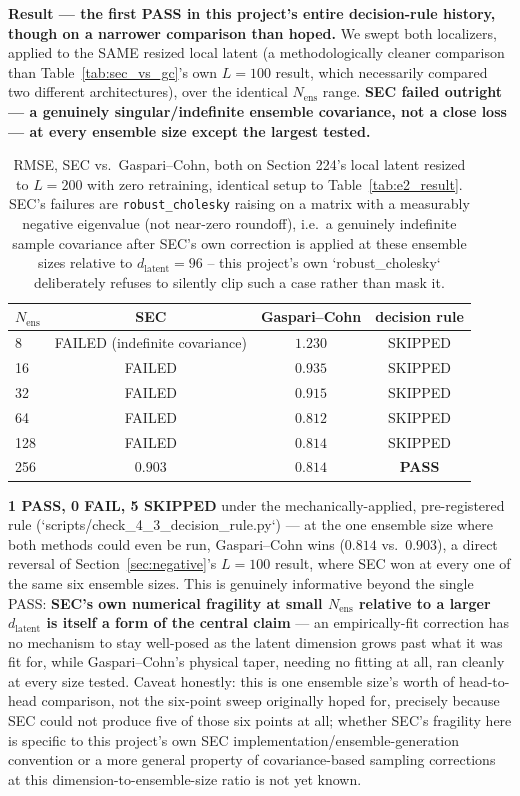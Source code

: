 \documentclass[11pt]{article}
\newcommand{\dlat}{d_{\mathrm{latent}}}
\begin{document}
\textbf{Result --- the first PASS in this project's entire
decision-rule history, though on a narrower comparison than hoped.}
We swept both localizers, applied to the SAME resized local latent (a
methodologically cleaner comparison than Table~\ref{tab:sec_vs_gc}'s
own $L=100$ result, which necessarily compared two different
architectures), over the identical $N_{\mathrm{ens}}$ range.
\textbf{SEC failed outright --- a genuinely singular/indefinite
ensemble covariance, not a close loss --- at every ensemble size except
the largest tested.}

\begin{table}[h]
\centering
\begin{tabular}{lccc}
\toprule
$N_{\mathrm{ens}}$ & SEC & Gaspari--Cohn & decision rule \\
\midrule
8   & FAILED (indefinite covariance) & $1.230$ & SKIPPED \\
16  & FAILED & $0.935$ & SKIPPED \\
32  & FAILED & $0.915$ & SKIPPED \\
64  & FAILED & $0.812$ & SKIPPED \\
128 & FAILED & $0.814$ & SKIPPED \\
256 & $0.903$ & $0.814$ & \textbf{PASS} \\
\bottomrule
\end{tabular}
\caption{RMSE, SEC vs.\ Gaspari--Cohn, both on Section 224's local
latent resized to $L=200$ with zero retraining, identical setup to
Table~\ref{tab:e2_result}. SEC's failures are
\texttt{robust\_cholesky} raising on a matrix with a measurably
negative eigenvalue (not near-zero roundoff), i.e.\ a genuinely
indefinite sample covariance after SEC's own correction is applied at
these ensemble sizes relative to $\dlat=96$ -- this project's own
`robust\_cholesky` deliberately refuses to silently clip such a case
rather than mask it.}
\label{tab:e3_result}
\end{table}

\textbf{1 PASS, 0 FAIL, 5 SKIPPED} under the mechanically-applied,
pre-registered rule (`scripts/check\_4\_3\_decision\_rule.py`) --- at
the one ensemble size where both methods could even be run,
Gaspari--Cohn wins ($0.814$ vs.\ $0.903$), a direct reversal of
Section~\ref{sec:negative}'s $L=100$ result, where SEC won at every
one of the same six ensemble sizes. This is genuinely informative
beyond the single PASS: \textbf{SEC's own numerical fragility at small
$N_{\mathrm{ens}}$ relative to a larger $\dlat$ is itself a form of the
central claim} --- an empirically-fit correction has no mechanism to
stay well-posed as the latent dimension grows past what it was fit
for, while Gaspari--Cohn's physical taper, needing no fitting at all,
ran cleanly at every size tested. Caveat honestly: this is one
ensemble size's worth of head-to-head comparison, not the six-point
sweep originally hoped for, precisely because SEC could not produce
five of those six points at all; whether SEC's fragility here is
specific to this project's own SEC implementation/ensemble-generation
convention or a more general property of covariance-based sampling
corrections at this dimension-to-ensemble-size ratio is not yet known.
\end{document}
